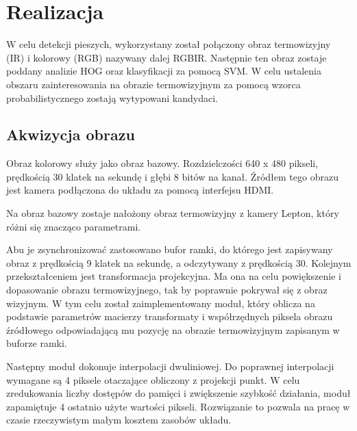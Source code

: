 \chapter{Realizacja}
\label{cha:real}



W celu detekcji pieszych, wykorzystany został połączony obraz termowizyjny (IR) i kolorowy (RGB) nazywany dalej RGBIR. 
Następnie ten obraz zostaje poddany analizie HOG oraz klasyfikacji za pomocą SVM. 
W celu ustalenia obszaru zainteresowania na obrazie termowizyjnym za pomocą wzorca probabilistycznego zostają wytypowani kandydaci. %


\section{Akwizycja obrazu}

Obraz kolorowy służy jako obraz bazowy. %
Rozdzielczości 640 x 480 pikseli, prędkością 30 klatek na sekundę i głębi 8 bitów na kanał. 
Źródłem tego obrazu jest kamera podłączona do układu za pomocą interfejsu HDMI. 

Na obraz bazowy zostaje nałożony obraz termowizyjny z kamery Lepton, który różni się znacząco parametrami. %

Abu je zsynchronizować zastosowano bufor ramki, do którego jest zapisywany obraz z prędkością 9 klatek na sekundę, a odczytywany z prędkością 30. 
Kolejnym przekształceniem jest transformacja projekcyjna. 
Ma ona na celu powiększenie i dopasowanie obrazu termowizyjnego, tak by poprawnie pokrywał się z obraz wizyjnym. 
W tym celu został zaimplementowany moduł, który oblicza na podstawie parametrów macierzy transformaty i współrzędnych piksela obrazu źródłowego odpowiadającą mu pozycję na obrazie termowizyjnym zapisanym w buforze ramki. %
 
Następny moduł dokonuje interpolacji dwuliniowej. 
Do poprawnej interpolacji wymagane są 4 piksele otaczające obliczony z projekcji punkt. 
W celu zredukowania liczby dostępów do pamięci i zwiększenie szybkość działania, moduł zapamiętuje 4 ostatnio użyte wartości pikseli. 
Rozwiązanie to pozwala na pracę w czasie rzeczywistym małym kosztem zasobów układu.

